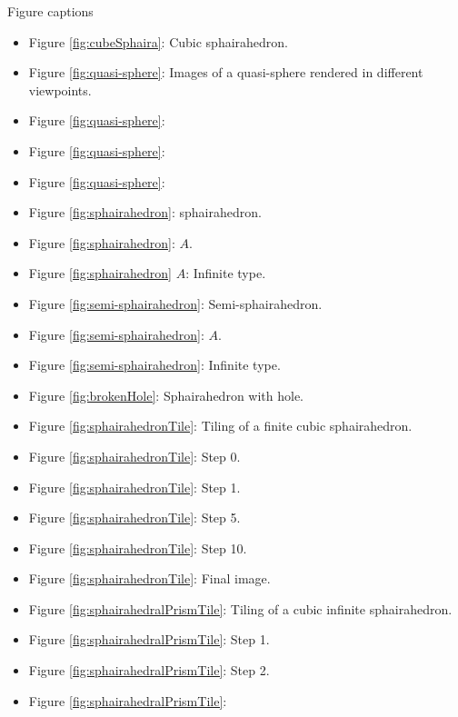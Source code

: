 \documentclass[suppldata, dvipdfmx]{interact}
\theoremstyle{plain}%
\theoremstyle{definition}
\theoremstyle{remark}
\theoremstyle{problemstyle}
\begin{document}
Figure captions
\begin{itemize}
 \item Figure \ref{fig:cubeSphaira}: Cubic sphairahedron.
 \item Figure \ref{fig:quasi-sphere}: Images of a quasi-sphere rendered
       in different viewpoints. 
 \item Figure \ref{fig:quasi-sphere}:
 \item Figure \ref{fig:quasi-sphere}:
 \item Figure \ref{fig:quasi-sphere}:
 \item Figure \ref{fig:sphairahedron}: sphairahedron.
 \item Figure \ref{fig:sphairahedron}:
       $A$.
 \item Figure \ref{fig:sphairahedron}
       $A$: Infinite type.
 \item Figure \ref{fig:semi-sphairahedron}: Semi-sphairahedron.
 \item Figure \ref{fig:semi-sphairahedron}:
       $A$.
 \item Figure \ref{fig:semi-sphairahedron}:
       Infinite type.
 \item Figure \ref{fig:brokenHole}: Sphairahedron with hole.
 \item Figure \ref{fig:sphairahedronTile}: Tiling of a finite cubic
       sphairahedron.
 \item Figure \ref{fig:sphairahedronTile}: Step 0.
 \item Figure \ref{fig:sphairahedronTile}: Step 1.
 \item Figure \ref{fig:sphairahedronTile}: Step 5.
 \item Figure \ref{fig:sphairahedronTile}: Step
       10.
 \item Figure \ref{fig:sphairahedronTile}:
       Final image.
 \item Figure \ref{fig:sphairahedralPrismTile}: Tiling of a cubic infinite sphairahedron.
 \item Figure \ref{fig:sphairahedralPrismTile}:
       Step 1.
 \item Figure \ref{fig:sphairahedralPrismTile}:
       Step 2.
 \item Figure \ref{fig:sphairahedralPrismTile}:

\end{itemize}
\end{document}
